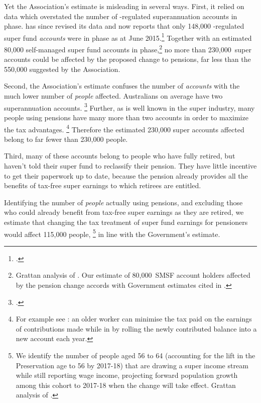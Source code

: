 \documentclass[continuous]{grattan}\usepackage[]{graphicx}\usepackage[]{color}
\begin{document}
\label{ASFA-estimate-of-TTR-misleading}
Yet the Association's estimate is misleading in several ways. 
First, it relied on \APRA{} data which overstated the number of \APRA{}-regulated superannuation accounts in \TTR{} phase\@. 
\APRA{} has since revised its data and
now reports that only 148,000 \APRA{}-regulated super fund \emph{accounts} were in \TTR{} phase as at June 2015.\footcite{APRA-2016-Super-stats-pension-member-profile}
Together with an estimated 80,000 self-managed super fund accounts in \TTR{} phase,\footnote{Grattan analysis of \textcites{ATO2014e}{ATO-SMSF-2015}. Our estimate of 80,000~SMSF account holders affected by the \TTR{} pension change accords with Government estimates cited in \textcite{Crow-2016-Election-2016-ODwyer-Super}.} no more than 230,000~super accounts could be affected by the proposed change to \TTR{} pensions, far less than the 550,000 suggested by the Association. 

Second, the Association's estimate confuses the number of \TTR{} \mbox{\emph{accounts}} with the much lower number of \emph{people} affected. 
Australians on average have two superannuation accounts.%
\footcite[][13]{MinifieSavageCameron2015} %
Further, as is well known in the super industry, many people using \TTR{} pensions have many more than two accounts in order to maximize the tax advantages.%
\footnote{For example see \textcites{Superfund-wholesale-strategy--multiple-SMSF-pension-accounts}{Superfund-multiple-pension-accounts}: 
an older worker can minimise the tax paid on the earnings of contributions made while in \TTR{} by rolling the newly contributed balance into a new account each year.}
Therefore the estimated 230,000 super accounts affected belong to far fewer than 230,000 people. 

Third, many of these accounts belong to people who have fully retired, but haven't told their super fund to reclassify their pension.
They have little incentive to get their paperwork up to date, because the \TTR{} pension already provides all the benefits of tax-free super earnings to which retirees are entitled. 

Identifying the number of \emph{people} actually using \TTR{} pensions, and excluding those who could already benefit from tax-free super earnings as they are retired, we estimate that changing the tax treatment of super fund earnings for \TTR{} pensioners would affect 115,000 people,%
\footnote{We identify the number of people aged 56 to 64 (accounting for the lift in the Preservation age to 56 by 2017-18) that are drawing a super income stream while still reporting wage income, projecting forward population growth among this cohort to 2017-18 when the change will take effect.
Grattan analysis of \textcite{ABS2015-Survey-of-income-and-housing-2013-14}.} %
in line with the Government's estimate.
\end{document}
